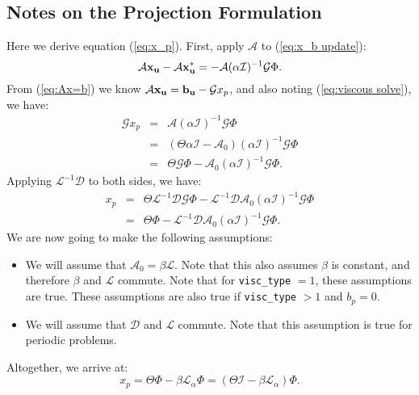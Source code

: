 \documentclass[final]{siamltex}
\def\bb {{\bf b}}
\def\ub {{\bf u}}
\def\xb {{\bf x}}
\begin{document}
\subsection{Notes on the Projection Formulation}\label{sec:projection}
Here we derive equation (\ref{eq:x_p}).  First, apply $\mathcal{A}$ to (\ref{eq:x_b update}):
\begin{equation}
\mathcal{A}\xb_{\ub} - \mathcal{A}\xb_{\ub}^* = -\mathcal{A}(\alpha\mathcal{I})^{-1}\mathcal{G}\Phi.
\end{equation}
From (\ref{eq:Ax=b}) we know $\mathcal{A}\xb_{\ub} = \bb_{\ub} - \mathcal{G} x_p$, 
and also noting (\ref{eq:viscous solve}), we have:
\begin{eqnarray}
\mathcal{G} x_p &=& \mathcal{A}(\alpha\mathcal{I})^{-1}\mathcal{G}\Phi\nonumber\\
&=& \left(\Theta\alpha\mathcal{I} - \mathcal{A}_0\right)(\alpha\mathcal{I})^{-1}\mathcal{G}\Phi\nonumber\\
&=&\Theta\mathcal{G}\Phi -\mathcal{A}_0(\alpha\mathcal{I})^{-1}\mathcal{G}\Phi.
\end{eqnarray}
Applying $\mathcal{L}^{-1}\mathcal{D}$ to both sides, we have:
\begin{eqnarray}
x_p &=& \Theta\mathcal{L}^{-1}\mathcal{D}\mathcal{G}\Phi - \mathcal{L}^{-1}\mathcal{D}\mathcal{A}_0(\alpha\mathcal{I})^{-1}\mathcal{G}\Phi\nonumber\\
&=& \Theta\Phi - \mathcal{L}^{-1}\mathcal{D}\mathcal{A}_0(\alpha\mathcal{I})^{-1}\mathcal{G}\Phi.
\end{eqnarray}
We are now going to make the following assumptions:\\
\begin{itemize}
\item We will assume that $\mathcal{A}_0 = \beta\mathcal{L}$.  Note that this also 
assumes $\beta$ is constant, and therefore $\beta$ and $\mathcal{L}$ commute.
Note that for {\tt visc\_type} $=1$, these assumptions are true.
These assumptions are also true if {\tt visc\_type} $>1$ and $b_p=0$.\\
\item We will assume that $\mathcal{D}$ and $\mathcal{L}$ commute.  Note that this 
assumption is true for periodic problems.\\
\end{itemize}
Altogether, we arrive at:
\begin{equation}
x_p = \Theta\Phi - \beta\mathcal{L}_\alpha\Phi = \left(\Theta\mathcal{I} - \beta\mathcal{L}_\alpha\right)\Phi.
\end{equation}
\end{document}
